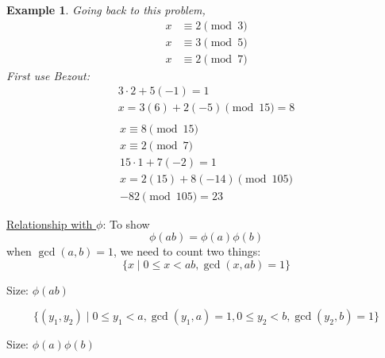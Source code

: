 \documentclass[letterpaper]{article}
\newtheorem{example}{Example}[subsection]
\begin{document}
        \begin{example} 
            Going back to this problem, 
            \begin{align*}
                x &\equiv 2\pmod{3} \\
                x &\equiv 3\pmod{5} \\
                x &\equiv 2\pmod{7}
            \end{align*}
            First use Bezout:
            \begin{align*}
                3\cdot 2+5(-1)=1 \\
                x = 3(6)+2(-5)\pmod{15} = 8 \\
            \end{align*} 
            \begin{align*}
                x\equiv 8\pmod{15} \\
                x\equiv 2\pmod{7} \\
                15\cdot 1 + 7(-2) = 1 \\
                x = 2(15) + 8(-14)\pmod{105} \\
                -82\pmod{105} = 23
            \end{align*}
        \end{example}   

        \underline{Relationship with $\phi$}: To show
        \[ \phi(ab) = \phi(a)\phi(b) \]
        when $\gcd(a,b)=1$, we need to count two things: 
        \[ 
            \{ x\mid 0\le x<ab, \gcd(x,ab)=1 \} 
        \]
        \begin{center}Size: $\phi(ab)$\end{center}
        \[ 
            \{ (y_1,y_2)\mid 0\le y_1 < a, \gcd(y_1,a)=1,
            0\le y_2<b, \gcd(y_2,b)=1 \} 
        \]
        \begin{center}Size: $\phi(a)\phi(b)$\end{center}
\end{document}
